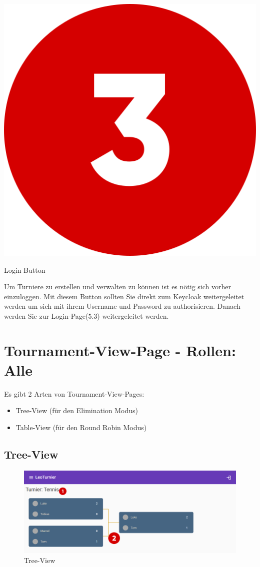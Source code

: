 \newpage
\includegraphics[scale=0.05]{pics/user-guide/numbers/number-3.png} \begin{LARGE} Login Button \end{LARGE}

Um Turniere zu erstellen und verwalten zu können ist es nötig sich vorher einzuloggen. Mit diesem Button sollten Sie direkt zum Keycloak weitergeleitet werden um sich mit ihrem Username und Password zu authorisieren.
Danach werden Sie zur Login-Page(5.3) weitergeleitet werden.

\newpage
\section{Tournament-View-Page - Rollen: Alle}

Es gibt 2 Arten von Tournament-View-Pages:
\begin{itemize}
    \item Tree-View (für den Elimination Modus)
    \item Table-View (für den Round Robin Modus)
\end{itemize}

\subsection{Tree-View}
\begin{figure}[H]
    \includegraphics[scale=0.4]{pics/user-guide/tree-view.png}
    \caption{Tree-View}
\end{figure}
\bigskip

